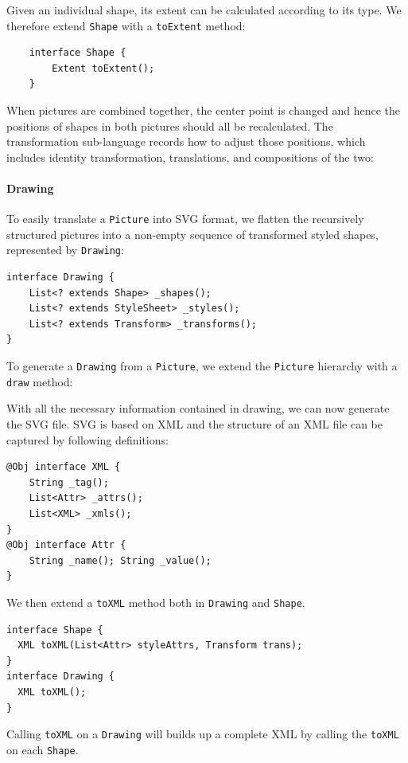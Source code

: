 Given an individual shape, its extent can be calculated according to its type.
We therefore extend \texttt{Shape} with a \texttt{toExtent} method:

\begin{lstlisting}
    interface Shape {
        Extent toExtent();
    }
\end{lstlisting}

When pictures are combined together, the center point is changed and hence the
positions of shapes in both pictures should all be recalculated.
The transformation sub-language records how to adjust those positions,
which includes identity transformation, translations, and compositions of the two:


\paragraph{Drawing}
To easily translate a \texttt{Picture} into SVG format, we flatten the recursively structured pictures into a non-empty
sequence of transformed styled shapes, represented by \texttt{Drawing}:

\begin{lstlisting}
interface Drawing {
    List<? extends Shape> _shapes();
    List<? extends StyleSheet> _styles();
    List<? extends Transform> _transforms();
}
\end{lstlisting}

To generate a \texttt{Drawing} from a \texttt{Picture}, we extend the
\texttt{Picture} hierarchy with a \texttt{draw} method:


With all the necessary information contained in drawing, we can now generate the
SVG file. SVG is based on XML and the structure of an XML file can be captured by following definitions:
\begin{lstlisting}
@Obj interface XML {
    String _tag();
    List<Attr> _attrs();
    List<XML> _xmls();
}
@Obj interface Attr {
    String _name(); String _value();
}
\end{lstlisting}
We then extend a \texttt{toXML} method both in \texttt{Drawing} and \texttt{Shape}.
\begin{lstlisting}
interface Shape {
  XML toXML(List<Attr> styleAttrs, Transform trans);
}
interface Drawing {
  XML toXML();
}
\end{lstlisting}
Calling \texttt{toXML} on a \texttt{Drawing} will builds up a complete XML by calling the \texttt{toXML} on each \texttt{Shape}.

